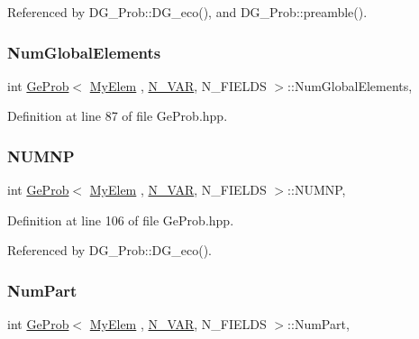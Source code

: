 Referenced by D\+G\+\_\+\+Prob\+::\+D\+G\+\_\+eco(), and D\+G\+\_\+\+Prob\+::preamble().

\mbox{\label{classGeProb_af87232ea7d32eff7618f97a9792b3761}} 
\subsubsection{\texorpdfstring{Num\+Global\+Elements}{NumGlobalElements}}
{\footnotesize\ttfamily int \hyperlink{classGeProb}{Ge\+Prob}$<$ \hyperlink{DG__Prob_8h_a83cd887ced9a6587428f267e50cd4787}{My\+Elem} , \hyperlink{classED__Prob_a4e7d2ff1a8e435e336fb00c527224b5a}{N\+\_\+\+V\+AR}, N\+\_\+\+F\+I\+E\+L\+DS $>$\+::Num\+Global\+Elements\hspace{0.3cm}{\ttfamily [protected]}, {\ttfamily [inherited]}}



Definition at line 87 of file Ge\+Prob.\+hpp.

\mbox{\label{classGeProb_adf7ed4cdeae11b7e6f15acc0ca7c1d21}} 
\subsubsection{\texorpdfstring{N\+U\+M\+NP}{NUMNP}}
{\footnotesize\ttfamily int \hyperlink{classGeProb}{Ge\+Prob}$<$ \hyperlink{DG__Prob_8h_a83cd887ced9a6587428f267e50cd4787}{My\+Elem} , \hyperlink{classED__Prob_a4e7d2ff1a8e435e336fb00c527224b5a}{N\+\_\+\+V\+AR}, N\+\_\+\+F\+I\+E\+L\+DS $>$\+::N\+U\+M\+NP\hspace{0.3cm}{\ttfamily [protected]}, {\ttfamily [inherited]}}



Definition at line 106 of file Ge\+Prob.\+hpp.



Referenced by D\+G\+\_\+\+Prob\+::\+D\+G\+\_\+eco().

\mbox{\label{classGeProb_ab269c3e7eeb6ae7c5fd87ae54df757b2}} 
\subsubsection{\texorpdfstring{Num\+Part}{NumPart}}
{\footnotesize\ttfamily int \hyperlink{classGeProb}{Ge\+Prob}$<$ \hyperlink{DG__Prob_8h_a83cd887ced9a6587428f267e50cd4787}{My\+Elem} , \hyperlink{classED__Prob_a4e7d2ff1a8e435e336fb00c527224b5a}{N\+\_\+\+V\+AR}, N\+\_\+\+F\+I\+E\+L\+DS $>$\+::Num\+Part\hspace{0.3cm}{\ttfamily [protected]}, {\ttfamily [inherited]}}



